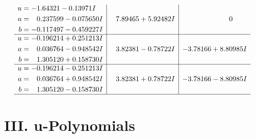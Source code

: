 \documentclass[1p]{elsarticle_modified}
\theoremstyle{definition}
\begin{document}
$$\begin{array}{c|c|c}
\begin{aligned}
u &= -1.64321 - 0.13971 I \\
a &= \phantom{-}0.237599 - 0.075650 I \\
b &= -0.117497 - 0.459227 I\end{aligned}
 & \phantom{-}7.89465 + 5.92482 I & \phantom{-0.000000 } 0 \\ \hline\begin{aligned}
u &= -0.196214 + 0.251213 I \\
a &= \phantom{-}0.036764 - 0.948542 I \\
b &= \phantom{-}1.305120 + 0.158730 I\end{aligned}
 & \phantom{-}3.82381 - 0.78722 I & -3.78166 + 8.80985 I \\ \hline\begin{aligned}
u &= -0.196214 - 0.251213 I \\
a &= \phantom{-}0.036764 + 0.948542 I \\
b &= \phantom{-}1.305120 - 0.158730 I\end{aligned}
 & \phantom{-}3.82381 + 0.78722 I & -3.78166 - 8.80985 I\\
 \hline 
 \end{array}$$\newpage
\newpage\renewcommand{\arraystretch}{1}
\centering \section*{ III. u-Polynomials}
\end{document}
